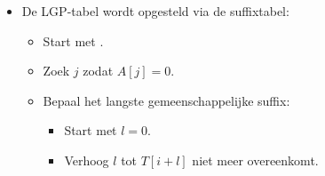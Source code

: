 \begin{itemize}
    \item De LGP-tabel wordt opgesteld via de suffixtabel:
    \begin{itemize}
        \item Start met .
        \item Zoek $j$ zodat $A[j] = 0$. 
        \item Bepaal het langste gemeenschappelijke suffix:
        \begin{itemize}
            \item Start met $l = 0$.
            \item Verhoog $l$ tot $T[i + l]$ niet meer overeenkomt.
        \end{itemize}
    \end{itemize}
    
\end{itemize}